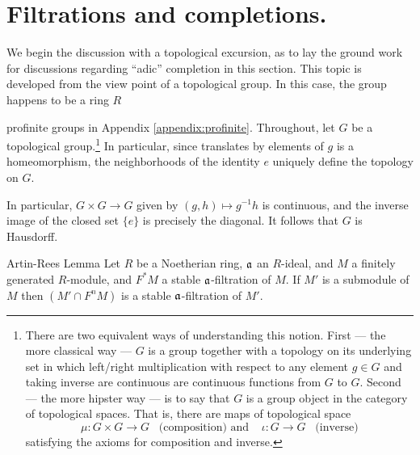 \section{Filtrations and completions.}

We begin the discussion with a topological excursion, as to lay
the ground work for discussions regarding ``adic'' completion in 
this section. This topic is developed from the view point of a
topological group. In this case, the group happens to be a ring
$R$

profinite groups in Appendix 
\ref{appendix:profinite}. Throughout, let $G$ be a topological 
group.\footnote{There are two equivalent ways of understanding 
this notion. First --- the more classical way --- $G$ is a group 
together with a topology on its underlying set in which left/right 
multiplication with respect to any element $g \in G$ and taking 
inverse are continuous are continuous functions from $G$ to $G$. 
Second --- the more hipster way --- is to say that $G$ is a group 
object in the category of topological spaces. That is, there are 
maps of topological space
\[
\mu: G \times G \to G\;\;\;\textrm{(composition) and}\;\;\;\;
\iota: G \to G\;\;\;\textrm{(inverse)}
\]
satisfying the axioms for composition and inverse.} In particular, 
since translates by elements of $g$ is a homeomorphism, the 
neighborhoods of the identity $e$ uniquely define the topology on 
$G$. 

In particular,
$G \times G \to G$ given by $(g, h) \mapsto g^{-1}h$ is 
continuous, and the inverse image of the closed set $\{e\}$ is 
precisely the diagonal. It follows that $G$ is Hausdorff.

\begin{thm}{Artin-Rees Lemma}\label{thm:artin_rees_lemma}
Let $R$ be a Noetherian ring, $\mathfrak{a}$ an $R$-ideal, and $M$ a
finitely generated $R$-module, and $F^*M$ a stable 
$\mathfrak{a}$-filtration of $M$. If $M'$ is a submodule of $M$ then
$(M' \cap F^nM)$ is a stable $\mathfrak{a}$-filtration of $M'$.


\end{thm}
